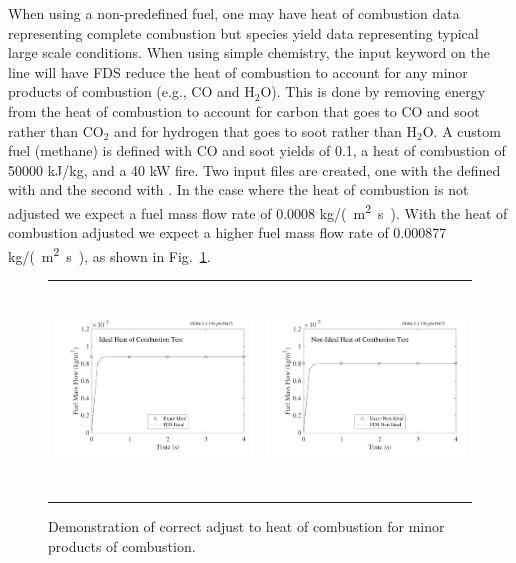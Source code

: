 \documentclass[11pt]{book}
\begin{document}
When using a non-predefined fuel, one may have heat of combustion data representing complete combustion but species yield data representing typical large scale conditions.  When using simple chemistry, the input keyword  on the  line will have FDS reduce the heat of combustion to account for any minor products of combustion (e.g., CO and H$_2$O).  This is done by removing energy from the heat of combustion to account for carbon that goes to CO and soot rather than CO$_2$ and for hydrogen that goes to soot rather than H$_2$O.  A custom fuel (methane) is defined with CO and soot yields of 0.1, a heat of combustion of 50000 kJ/kg, and a 40 kW fire.  Two input files are created, one with the  defined with  and the second with .  In the  case where the heat of combustion is not adjusted we expect a fuel mass flow rate of 0.0008 \si{kg/(m^2.s)}.  With the heat of combustion adjusted we expect a higher fuel mass flow rate of 0.000877 \si{kg/(m^2.s)}, as shown in Fig.~\ref{fig:HoC}.
\begin{figure}[h!]
\begin{tabular*}{\textwidth}{lr}
\includegraphics[height=2.2in]{SCRIPT_FIGURES/HoC_Ideal} &
\includegraphics[height=2.2in]{SCRIPT_FIGURES/HoC_NonIdeal}
\end{tabular*}
\caption[ and  test cases]{Demonstration of correct adjust to heat of combustion for minor products of combustion.}
\label{fig:HoC}
\end{figure}
\end{document}
